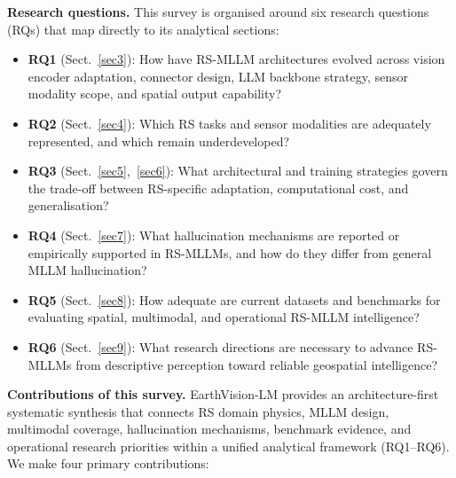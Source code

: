 \textbf{Research questions.}
This survey is organised around six research questions (RQs) that map
directly to its analytical sections:

\begin{itemize}
\item \textbf{RQ1} (Sect.~\ref{sec3}): How have RS-MLLM architectures evolved across vision encoder adaptation, connector design, LLM backbone strategy, sensor modality scope, and spatial output capability?
\item \textbf{RQ2} (Sect.~\ref{sec4}): Which RS tasks and sensor modalities are adequately represented, and which remain underdeveloped?
\item \textbf{RQ3} (Sect.~\ref{sec5},~\ref{sec6}): What architectural and training strategies govern the trade-off between RS-specific adaptation, computational cost, and generalisation?
\item \textbf{RQ4} (Sect.~\ref{sec7}): What hallucination mechanisms are reported or empirically supported in RS-MLLMs, and how do they differ from general MLLM hallucination?
\item \textbf{RQ5} (Sect.~\ref{sec8}): How adequate are current datasets and benchmarks for evaluating spatial, multimodal, and operational RS-MLLM intelligence?
\item \textbf{RQ6} (Sect.~\ref{sec9}): What research directions are necessary to advance RS-MLLMs from descriptive perception toward reliable geospatial intelligence?
\end{itemize}

\textbf{Contributions of this survey.}
EarthVision-LM provides an architecture-first systematic synthesis that connects
RS domain physics, MLLM design, multimodal coverage, hallucination mechanisms,
benchmark evidence, and operational research priorities within a unified analytical
framework (RQ1--RQ6). We make four primary contributions:

